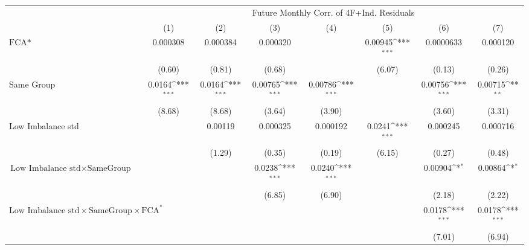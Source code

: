 {
\def\sym#1{\ifmmode^{#1}\else\(^{#1}\)\fi}
\begin{tabular}{l*{7}{c}}
\hline\hline
                &\multicolumn{7}{c}{Future Monthly Corr. of 4F+Ind. Residuals}                                                                       \\\cmidrule(lr){2-8}
                &\multicolumn{1}{c}{(1)}         &\multicolumn{1}{c}{(2)}         &\multicolumn{1}{c}{(3)}         &\multicolumn{1}{c}{(4)}         &\multicolumn{1}{c}{(5)}         &\multicolumn{1}{c}{(6)}         &\multicolumn{1}{c}{(7)}         \\
\hline
$ \text{FCA*} $ & 0.000308         & 0.000384         & 0.000320         &                  &  0.00945\sym{***}&0.0000633         & 0.000120         \\
                &   (0.60)         &   (0.81)         &   (0.68)         &                  &   (6.07)         &   (0.13)         &   (0.26)         \\
[1em]
Same Group      &   0.0164\sym{***}&   0.0164\sym{***}&  0.00765\sym{***}&  0.00786\sym{***}&                  &  0.00756\sym{***}&  0.00715\sym{**} \\
                &   (8.68)         &   (8.68)         &   (3.64)         &   (3.90)         &                  &   (3.60)         &   (3.31)         \\
[1em]
Low Imbalance std&                  &  0.00119         & 0.000325         & 0.000192         &   0.0241\sym{***}& 0.000245         & 0.000716         \\
                &                  &   (1.29)         &   (0.35)         &   (0.19)         &   (6.15)         &   (0.27)         &   (0.48)         \\
[1em]
 $ \text{Low Imbalance std} \times {\text{SameGroup} } $ &                  &                  &   0.0238\sym{***}&   0.0240\sym{***}&                  &  0.00904\sym{*}  &  0.00864\sym{*}  \\
                &                  &                  &   (6.85)         &   (6.90)         &                  &   (2.18)         &   (2.22)         \\
[1em]
 $ \text{Low Imbalance std} \times {\text{SameGroup} } \times \text{FCA}^*  $ &                  &                  &                  &                  &                  &   0.0178\sym{***}&   0.0178\sym{***}\\
                &                  &                  &                  &                  &                  &   (7.01)         &   (6.94)         \\

\end{tabular}}
